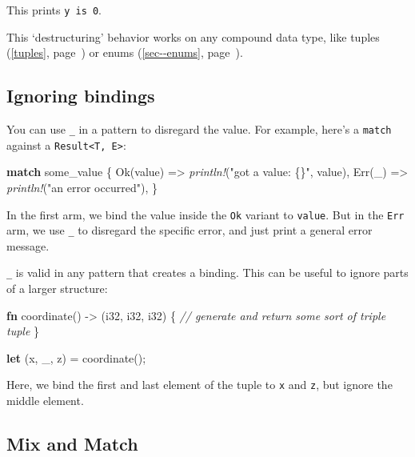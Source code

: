 \documentclass[a4paper,]{book}
\renewcommand*{\hyperref}[2][\ar]{%
  \def\ar{#2}%
  #2 (\autoref{#1}, page~\pageref{#1})}
\newenvironment{Shaded}{\begin{snugshade}}{\end{snugshade}}
\newcommand{\KeywordTok}[1]{\textcolor[rgb]{0.13,0.29,0.53}{\textbf{{#1}}}}
\newcommand{\DataTypeTok}[1]{\textcolor[rgb]{0.13,0.29,0.53}{{#1}}}
\newcommand{\ConstantTok}[1]{\textcolor[rgb]{0.00,0.00,0.00}{{#1}}}
\newcommand{\StringTok}[1]{\textcolor[rgb]{0.31,0.60,0.02}{{#1}}}
\newcommand{\CommentTok}[1]{\textcolor[rgb]{0.56,0.35,0.01}{\textit{{#1}}}}
\newcommand{\PreprocessorTok}[1]{\textcolor[rgb]{0.56,0.35,0.01}{\textit{{#1}}}}
\newcommand{\NormalTok}[1]{{#1}}
\begin{document}
This prints \texttt{y\ is\ 0}.

This `destructuring' behavior works on any compound data type, like
\hyperref[tuples]{tuples} or \hyperref[sec--enums]{enums}.

\subsection{Ignoring bindings}\label{ignoring-bindings}

You can use \texttt{\_} in a pattern to disregard the value. For
example, here's a \texttt{match} against a
\texttt{Result\textless{}T,\ E\textgreater{}}:

\begin{Shaded}
\begin{Highlighting}[]
\KeywordTok{match} \NormalTok{some_value \{}
    \ConstantTok{Ok}\NormalTok{(value) => }\PreprocessorTok{println!}\NormalTok{(}\StringTok{"got a value: \{\}"}\NormalTok{, value),}
    \ConstantTok{Err}\NormalTok{(_) => }\PreprocessorTok{println!}\NormalTok{(}\StringTok{"an error occurred"}\NormalTok{),}
\NormalTok{\}}
\end{Highlighting}
\end{Shaded}

In the first arm, we bind the value inside the \texttt{Ok} variant to
\texttt{value}. But in the \texttt{Err} arm, we use \texttt{\_} to
disregard the specific error, and just print a general error message.

\texttt{\_} is valid in any pattern that creates a binding. This can be
useful to ignore parts of a larger structure:

\begin{Shaded}
\begin{Highlighting}[]
\KeywordTok{fn} \NormalTok{coordinate() -> (}\DataTypeTok{i32}\NormalTok{, }\DataTypeTok{i32}\NormalTok{, }\DataTypeTok{i32}\NormalTok{) \{}
    \CommentTok{// generate and return some sort of triple tuple}
\NormalTok{\}}

\KeywordTok{let} \NormalTok{(x, _, z) = coordinate();}
\end{Highlighting}
\end{Shaded}

Here, we bind the first and last element of the tuple to \texttt{x} and
\texttt{z}, but ignore the middle element.

\subsection{Mix and Match}\label{mix-and-match}
\end{document}
